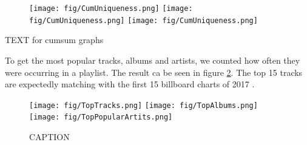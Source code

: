 \begin{figure}[ht]
    \centering
    \texttt{[image: fig/CumUniqueness.png]}
    \texttt{[image: fig/CumUniqueness.png]}
    \texttt{[image: fig/CumUniqueness.png]}
    \label{fig:cumUniqueness}
\end{figure}

\answerTODO{} TEXT for cumsum graphs

To get the most popular tracks, albums and artists, we counted how often they were occurring in a playlist. The result ca be seen in figure \ref{fig:popular}. The top 15 tracks are expectedly matching with the first 15 billboard charts of 2017 \cite{BillboardMedia}.

\begin{figure}[ht]
    \centering
    \texttt{[image: fig/TopTracks.png]}
    \texttt{[image: fig/TopAlbums.png]}
    \texttt{[image: fig/TopPopularArtits.png]}
    \caption{CAPTION}
    \label{fig:popular}
\end{figure}